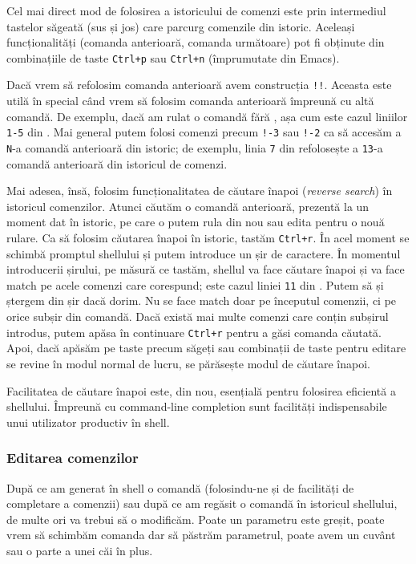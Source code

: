 Cel mai direct mod de folosirea a istoricului de comenzi este prin intermediul tastelor săgeată (sus și jos) care parcurg comenzile din istoric.
Aceleași funcționalități (comanda anterioară, comanda următoare) pot fi obținute din combinațiile de taste \texttt{Ctrl+p} sau \texttt{Ctrl+n} (împrumutate din Emacs).

Dacă vrem să refolosim comanda anterioară avem construcția \texttt{!!}.
Aceasta este utilă în special când vrem să folosim comanda anterioară împreună cu altă comandă.
De exemplu, dacă am rulat o comandă fără , așa cum este cazul liniilor \texttt{1-5} din .
Mai general putem folosi comenzi precum \texttt{!-3} sau \texttt{!-2} ca să accesăm a \texttt{N}-a comandă anterioară din istoric;
de exemplu, linia \texttt{7} din  refolosește a \texttt{13}-a comandă anterioară din istoricul de comenzi.

Mai adesea, însă, folosim funcționalitatea de căutare înapoi (\textit{reverse search}) în istoricul comenzilor.
Atunci căutăm o comandă anterioară, prezentă la un moment dat în istoric, pe care o putem rula din nou sau edita pentru o nouă rulare.
Ca să folosim căutarea înapoi în istoric, tastăm \texttt{Ctrl+r}.
În acel moment se schimbă promptul shellului și putem introduce un șir de caractere.
În momentul introducerii șirului, pe măsură ce tastăm, shellul va face căutare înapoi și va face match pe acele comenzi care corespund;
este cazul liniei \texttt{11} din .
Putem să și ștergem din șir dacă dorim.
Nu se face match doar pe începutul comenzii, ci pe orice subșir din comandă.
Dacă există mai multe comenzi care conțin subșirul introdus, putem apăsa în continuare \texttt{Ctrl+r} pentru a găsi comanda căutată.
Apoi, dacă apăsăm pe taste precum săgeți sau combinații de taste pentru editare se revine în modul normal de lucru, se părăsește modul de căutare înapoi.

Facilitatea de căutare înapoi este, din nou, esențială pentru folosirea eficientă a shellului.
Împreună cu command-line completion sunt facilități indispensabile unui utilizator productiv în shell.

\subsubsection{Editarea comenzilor}
\label{sec:cli:shell:features:editing}

După ce am generat în shell o comandă (folosindu-ne și de facilități de completare a comenzii) sau după ce am regăsit o comandă în istoricul shellului, de multe ori va trebui să o modificăm.
Poate un parametru este greșit, poate vrem să schimbăm comanda dar să păstrăm parametrul, poate avem un cuvânt sau o parte a unei căi în plus.

